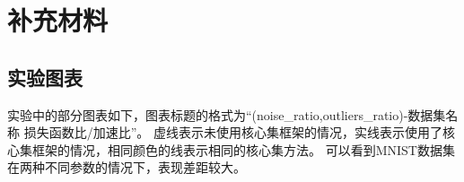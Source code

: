 
\chapter{补充材料}


\section{实验图表}


实验中的部分图表如下，图表标题的格式为“(noise\_ratio,outliers\_ratio)-数据集名称 损失函数比/加速比”。
虚线表示未使用核心集框架的情况，实线表示使用了核心集框架的情况，相同颜色的线表示相同的核心集方法。
可以看到MNIST数据集在两种不同参数的情况下，表现差距较大。
\begin{figure}
    


\end{figure}
